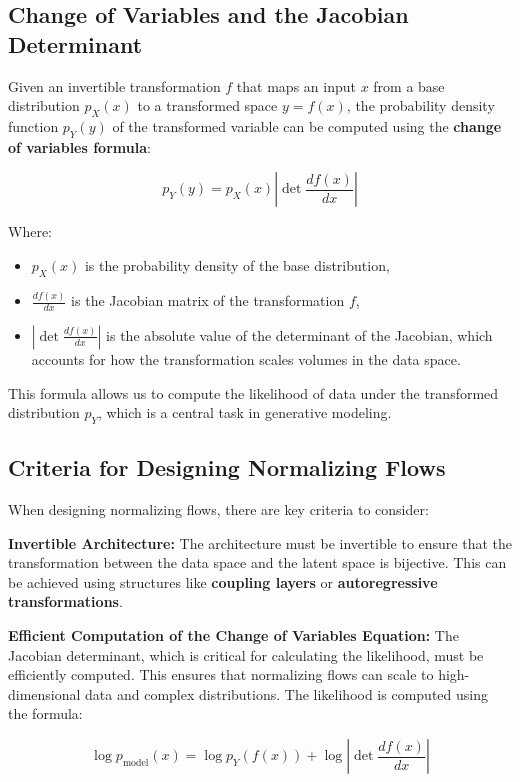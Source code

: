 \documentclass{article}
\begin{document}
\subsection{Change of Variables and the Jacobian Determinant}
Given an invertible transformation \( f \) that maps an input \( x \) from a base distribution \( p_X(x) \) to a transformed space \( y = f(x) \), the probability density function \( p_Y(y) \) of the transformed variable can be computed using the \textbf{change of variables formula}:

\[
p_Y(y) = p_X(x) \left| \det \frac{d f(x)}{dx} \right|
\]

Where:
\begin{itemize}
    \item \( p_X(x) \) is the probability density of the base distribution,
    \item \( \frac{d f(x)}{dx} \) is the Jacobian matrix of the transformation \( f \),
    \item \( \left| \det \frac{d f(x)}{dx} \right| \) is the absolute value of the determinant of the Jacobian, which accounts for how the transformation scales volumes in the data space.
\end{itemize}

This formula allows us to compute the likelihood of data under the transformed distribution \( p_Y \), which is a central task in generative modeling.

\subsection{Criteria for Designing Normalizing Flows}
When designing normalizing flows, there are key criteria to consider:


\textbf{Invertible Architecture:} The architecture must be invertible to ensure that the transformation between the data space and the latent space is bijective. This can be achieved using structures like \textbf{coupling layers} or \textbf{autoregressive transformations}.

\textbf{Efficient Computation of the Change of Variables Equation:} The Jacobian determinant, which is critical for calculating the likelihood, must be efficiently computed. This ensures that normalizing flows can scale to high-dimensional data and complex distributions. The likelihood is computed using the formula:

\[
\log p_{\text{model}}(x) = \log p_Y(f(x)) + \log \left| \det \frac{d f(x)}{dx} \right|
\]
\end{document}
